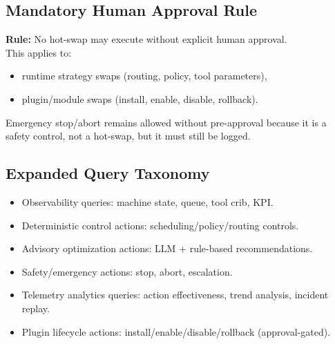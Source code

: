 \documentclass{article}
\begin{document}
\subsection{Mandatory Human Approval Rule}
\textbf{Rule:} No hot-swap may execute without explicit human approval. \\
This applies to:
\begin{itemize}
\item runtime strategy swaps (routing, policy, tool parameters),
\item plugin/module swaps (install, enable, disable, rollback).
\end{itemize}
Emergency stop/abort remains allowed without pre-approval because it is a safety control, not a hot-swap, but it must still be logged.

\subsection{Expanded Query Taxonomy}
\begin{itemize}
\item Observability queries: machine state, queue, tool crib, KPI.
\item Deterministic control actions: scheduling/policy/routing controls.
\item Advisory optimization actions: LLM + rule-based recommendations.
\item Safety/emergency actions: stop, abort, escalation.
\item Telemetry analytics queries: action effectiveness, trend analysis, incident replay.
\item Plugin lifecycle actions: install/enable/disable/rollback (approval-gated).
\end{itemize}
\end{document}
